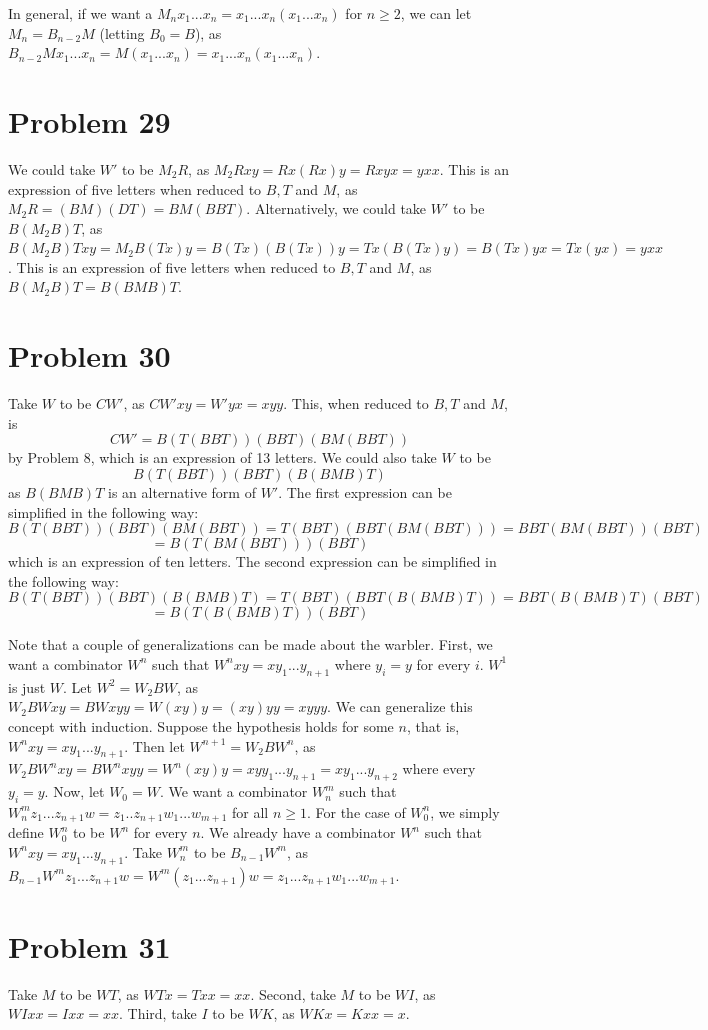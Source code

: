 \documentclass{article}
\theoremstyle{definition}
\begin{document}
In general, if we want a $M_nx_1...x_n=x_1...x_n(x_1...x_n)$ for $n\ge 2$, we can let $M_n=B_{n-2}M$ (letting $B_0=B$), as $B_{n-2}Mx_1...x_n=M(x_1...x_n)=x_1...x_n(x_1...x_n)$.

\section*{Problem 29}
We could take $W'$ to be $M_2R$, as $M_2Rxy=Rx(Rx)y=Rxyx=yxx$. This is an expression of five letters when reduced to $B,T$ and $M$, as $M_2R=(BM)(DT)=BM(BBT)$.
Alternatively, we could take $W'$ to be $B(M_2B)T$, as $B(M_2B)Txy=M_2B(Tx)y=B(Tx)(B(Tx))y=Tx(B(Tx)y)=B(Tx)yx=Tx(yx)=yxx$. 
This is an expression of five letters when reduced to $B,T$ and $M$, as $B(M_2B)T=B(BMB)T$.

\section*{Problem 30}
Take $W$ to be $CW'$, as $CW'xy=W'yx=xyy$. This, when reduced to $B,T$ and $M$, is 
\[ CW'=B(T(BBT))(BBT)(BM(BBT)) \] by Problem 8, which is an expression of 13 letters. We could also take $W$ to be 
\[ B(T(BBT))(BBT)(B(BMB)T) \] as $B(BMB)T$ is an alternative form of $W'$.
The first expression can be simplified in the following way:
\[ B(T(BBT))(BBT)(BM(BBT))=T(BBT)(BBT(BM(BBT)))=BBT(BM(BBT))(BBT) \]
\[ =B(T(BM(BBT)))(BBT) \] which is an expression of ten letters. The second expression can be 
simplified in the following way:
\[ B(T(BBT))(BBT)(B(BMB)T)=T(BBT)(BBT(B(BMB)T))=BBT(B(BMB)T)(BBT) \]
\[ =B(T(B(BMB)T))(BBT) \] 


Note that a couple of generalizations can be made about the warbler. First, we want a combinator $W^n$ such that 
$W^nxy=xy_1...y_{n+1}$ where $y_i=y$ for every $i$. $W^1$ is just $W$. Let $W^2=W_2BW$, as $W_2BWxy=BWxyy=W(xy)y=(xy)yy=xyyy$. We can generalize this concept with induction. Suppose the 
hypothesis holds for some $n$, that is, $W^nxy=xy_1...y_{n+1}$. Then let $W^{n+1}=W_2BW^n$, as $W_2BW^nxy=BW^nxyy=W^n(xy)y=xyy_1...y_{n+1}=xy_1...y_{n+2}$ where 
every $y_i=y$. Now, let $W_0=W$. We want a combinator $W_n^m$ such that $W_n^mz_1...z_{n+1}w=z_1..z_{n+1}w_1...w_{m+1}$ for all $n\ge 1$. For the case of $W_0^n$, we simply 
define $W_0^n$ to be $W^n$ for every $n$. We already have a combinator 
$W^n$ such that $W^nxy=xy_1...y_{n+1}$. Take $W_n^m$ to be $B_{n-1}W^m$, as $B_{n-1}W^mz_1...z_{n+1}w=W^m(z_1...z_{n+1})w=z_1...z_{n+1}w_1...w_{m+1}$.

\section*{Problem 31}
Take $M$ to be $WT$, as $WTx=Txx=xx$. Second, take $M$ to be $WI$, as $WIxx=Ixx=xx$. Third, take $I$ to be
$WK$, as $WKx=Kxx=x$.
\end{document}
